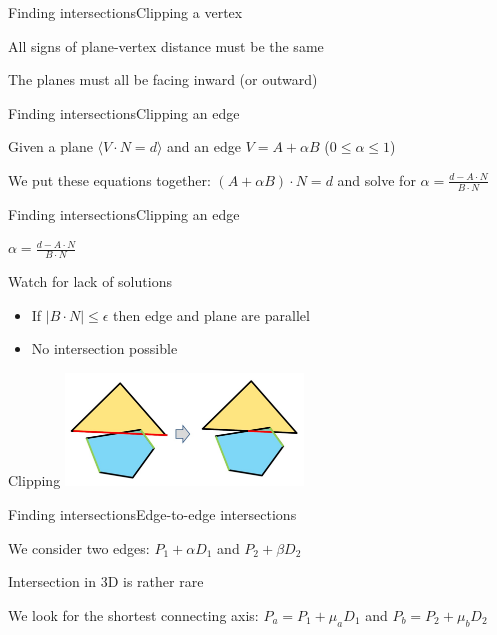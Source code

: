 \documentclass{beamer}
\begin{document}
\begin{slide}{Finding intersections}{Clipping a vertex}{
\item All signs of plane-vertex distance must be the same
\item The planes must all be facing inward (or outward)
}\end{slide}

\begin{slide}{Finding intersections}{Clipping an edge}{
\item Given a plane $\langle V \cdot N = d \rangle$ and an edge $V = A + \alpha B$ ($0 \leq \alpha \leq 1$)
\item We put these equations together: $(A + \alpha B) \cdot N = d$ and solve for $\alpha = \frac{d - A \cdot N}{B \cdot N}$
}\end{slide}

\begin{slide}{Finding intersections}{Clipping an edge}{
\item $\alpha = \frac{d - A \cdot N}{B \cdot N}$
\item Watch for lack of solutions
\begin{itemize}
\item If $|B \cdot N| \leq \epsilon$ then edge and plane are parallel
\item No intersection possible
\end{itemize}
}\end{slide}

\begin{frame}{Clipping}
\center
\includegraphics[height=3cm]{Pics/PlaneEdgeClipping.png}
\end{frame}

\begin{slide}{Finding intersections}{Edge-to-edge intersections}{
\item We consider two edges: $P_1 + \alpha D_1$ and $P_2 + \beta D_2$
\item Intersection in 3D is rather rare
\item We look for the shortest connecting axis: $P_a = P_1 + \mu_a D_1$ and $P_b = P_2 + \mu_b D_2$
}\end{slide}
\end{document}
